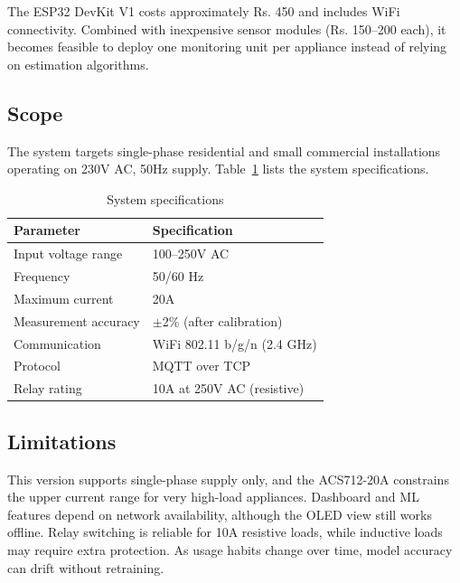\documentclass[12pt, a4paper]{article}
\numberwithin{figure}{section}
\numberwithin{table}{section}
\begin{document}
	The ESP32 DevKit V1 costs approximately Rs. 450 and includes WiFi connectivity. Combined with inexpensive sensor modules (Rs. 150--200 each), it becomes feasible to deploy one monitoring unit per appliance instead of relying on estimation algorithms.
	
	\subsection{Scope}
	
	The system targets single-phase residential and small commercial installations operating on 230V AC, 50Hz supply. Table~\ref{tab:specs} lists the system specifications.
	
	\begin{table}[H]
		\centering
		\caption{System specifications}
		\label{tab:specs}
		\vspace{6pt}
		\begin{tabular}{|l|l|}
			\hline
			\textbf{Parameter} & \textbf{Specification} \\
			\hline
			Input voltage range & 100--250V AC \\
			Frequency & 50/60 Hz \\
			Maximum current & 20A \\
			Measurement accuracy & $\pm$2\% (after calibration) \\
			Communication & WiFi 802.11 b/g/n (2.4 GHz) \\
			Protocol & MQTT over TCP \\
			Relay rating & 10A at 250V AC (resistive) \\
			\hline
		\end{tabular}
	\end{table}
	
	\subsection{Limitations}
	
	This version supports single-phase supply only, and the ACS712-20A constrains the upper current range for very high-load appliances. Dashboard and ML features depend on network availability, although the OLED view still works offline. Relay switching is reliable for 10A resistive loads, while inductive loads may require extra protection. As usage habits change over time, model accuracy can drift without retraining.
	
	\newpage
	
\end{document}
